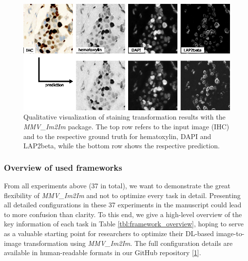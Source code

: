 \begin{figure}
\hypertarget{fig:multiplex}{%
\centering
\includegraphics{images/multiplex_justin.png}
\caption{Qualitative visualization of staining transformation results with the \emph{MMV\_Im2Im} package. The top row refers to the input image (IHC) and to the respective ground truth for hematoxylin, DAPI and LAP2beta, while the bottom row shows the respective prediction.}\label{fig:multiplex}
}
\end{figure}

\hypertarget{overview-of-used-frameworks}{%
\subsubsection{Overview of used frameworks}\label{overview-of-used-frameworks}}

From all experiments above (37 in total), we want to demonstrate the great flexibility of \emph{MMV\_Im2Im} and not to optimize every task in detail. Presenting all detailed configurations in these 37 experiments in the manuscript could lead to more confusion than clarity. To this end, we give a high-level overview of the key information of each task in Table \ref{tbl:framework_overview}, hoping to serve as a valuable starting point for researchers to optimize their DL-based image-to-image transformation using \emph{MMV\_Im2Im}. The full configuration details are available in human-readable formats in our GitHub repository {[}\protect\hyperlink{ref-10dtMviwb}{1}{]}.

